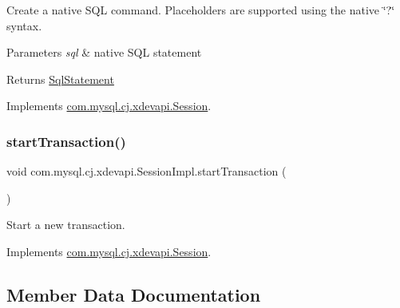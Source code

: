 Create a native S\+QL command. Placeholders are supported using the native \char`\"{}?\char`\"{} syntax.


\begin{DoxyParams}{Parameters}
{\em sql} & native S\+QL statement \\
\hline
\end{DoxyParams}
\begin{DoxyReturn}{Returns}
\mbox{\hyperlink{interfacecom_1_1mysql_1_1cj_1_1xdevapi_1_1_sql_statement}{Sql\+Statement}} 
\end{DoxyReturn}


Implements \mbox{\hyperlink{interfacecom_1_1mysql_1_1cj_1_1xdevapi_1_1_session_a4409e5c0f5917851f9875342b8d38b18}{com.\+mysql.\+cj.\+xdevapi.\+Session}}.

\mbox{\label{classcom_1_1mysql_1_1cj_1_1xdevapi_1_1_session_impl_a765f8d81a34ca32d608bdeb5e56e3119}} 
\subsubsection{\texorpdfstring{start\+Transaction()}{startTransaction()}}
{\footnotesize\ttfamily void com.\+mysql.\+cj.\+xdevapi.\+Session\+Impl.\+start\+Transaction (\begin{DoxyParamCaption}{ }\end{DoxyParamCaption})}

Start a new transaction. 

Implements \mbox{\hyperlink{interfacecom_1_1mysql_1_1cj_1_1xdevapi_1_1_session_a1c0d0951a9c3f1d92f9bd22f337dd86c}{com.\+mysql.\+cj.\+xdevapi.\+Session}}.



\subsection{Member Data Documentation}
\mbox{\label{classcom_1_1mysql_1_1cj_1_1xdevapi_1_1_session_impl_adce486defa0eedb92c66d0a7daf58551}} 
